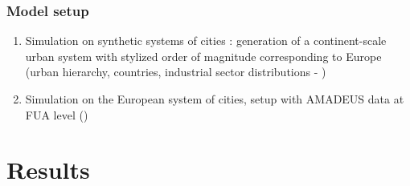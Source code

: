 \begin{frame}[label=setupmain]

\frametitle{Model setup}

\justify
 
\begin{enumerate} 
    \item Simulation on synthetic systems of cities \cite{raimbault2019space}: generation of a continent-scale urban system with stylized order of magnitude corresponding to Europe (urban hierarchy, countries, industrial sector distributions - \hyperlink{syntheticsetup}{})
    \bigskip
    \item Simulation on the European system of cities, setup with AMADEUS data at FUA level (\hyperlink{realsetup}{})
\end{enumerate}

\end{frame}


\section{Results}

